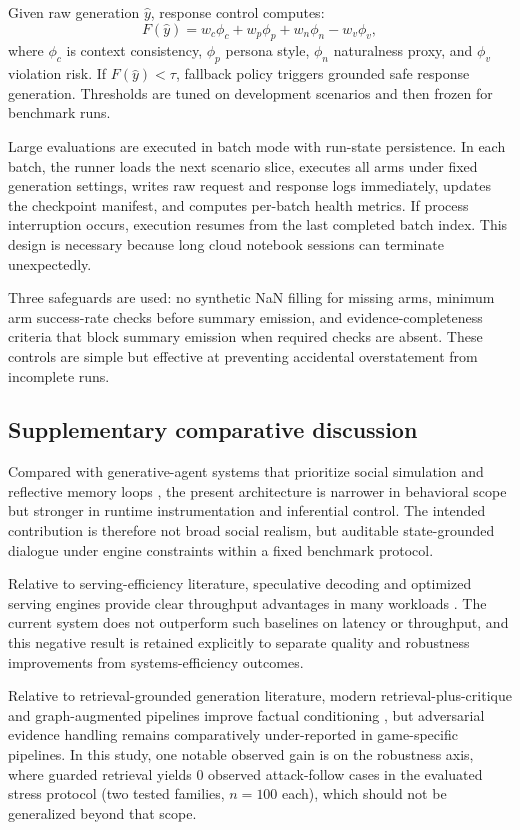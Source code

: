 ﻿\documentclass[a4paper,12pt]{article}
\begin{document}
Given raw generation \(\hat{y}\), response control computes:
\[
F(\hat{y}) = w_c \phi_c + w_p \phi_p + w_n \phi_n - w_v \phi_v,
\]
where \(\phi_c\) is context consistency, \(\phi_p\) persona style, \(\phi_n\) naturalness proxy, and \(\phi_v\) violation risk. If \(F(\hat{y}) < \tau\), fallback policy triggers grounded safe response generation. Thresholds are tuned on development scenarios and then frozen for benchmark runs.

Large evaluations are executed in batch mode with run-state persistence. In each batch, the runner loads the next scenario slice, executes all arms under fixed generation settings, writes raw request and response logs immediately, updates the checkpoint manifest, and computes per-batch health metrics. If process interruption occurs, execution resumes from the last completed batch index. This design is necessary because long cloud notebook sessions can terminate unexpectedly.

Three safeguards are used: no synthetic NaN filling for missing arms, minimum arm success-rate checks before summary emission, and evidence-completeness criteria that block summary emission when required checks are absent. These controls are simple but effective at preventing accidental overstatement from incomplete runs.

\subsection{Supplementary comparative discussion}
Compared with generative-agent systems that prioritize social simulation and reflective memory loops \cite{Park2023GenerativeAgents}, the present architecture is narrower in behavioral scope but stronger in runtime instrumentation and inferential control. The intended contribution is therefore not broad social realism, but auditable state-grounded dialogue under engine constraints within a fixed benchmark protocol.

Relative to serving-efficiency literature, speculative decoding and optimized serving engines provide clear throughput advantages in many workloads \cite{Leviathan2022SpecDec,Kwon2023vLLM}. The current system does not outperform such baselines on latency or throughput, and this negative result is retained explicitly to separate quality and robustness improvements from systems-efficiency outcomes.

Relative to retrieval-grounded generation literature, modern retrieval-plus-critique and graph-augmented pipelines improve factual conditioning \cite{Asai2024SelfRAG,Edge2024GraphRAG,Fan2024RAGSurvey}, but adversarial evidence handling remains comparatively under-reported in game-specific pipelines. In this study, one notable observed gain is on the robustness axis, where guarded retrieval yields 0 observed attack-follow cases in the evaluated stress protocol (two tested families, \(n=100\) each), which should not be generalized beyond that scope.
\end{document}
